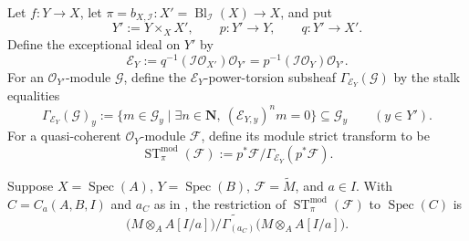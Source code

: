 \begin{definition}
  \label{def:nagata-module-strict-transform}
  \lean{}

  Let $f\colon Y\to X$, let
  $\pi=b_{X,\mathcal I}\colon X'=\operatorname{Bl}_{\mathcal I}(X)\to X$,
  and put
  \[
    Y':=Y\times_XX',\qquad
    p\colon Y'\to Y,\qquad q\colon Y'\to X'.
  \]
  Define the exceptional ideal on $Y'$ by
  \[
    \mathcal E_Y
      :=q^{-1}(\mathcal I\mathcal O_{X'})\mathcal O_{Y'}
      =p^{-1}(\mathcal I\mathcal O_Y)\mathcal O_{Y'}.
  \]
  For an $\mathcal O_{Y'}$-module $\mathcal G$, define the
  $\mathcal E_Y$-power-torsion subsheaf $\Gamma_{\mathcal E_Y}(\mathcal G)$
  by the stalk equalities
  \[
    \Gamma_{\mathcal E_Y}(\mathcal G)_y
      :=\{m\in\mathcal G_y\mid
           \exists n\in\mathbf N,\ (\mathcal E_{Y,y})^n m=0\}
      \subseteq\mathcal G_y
      \qquad(y\in Y').
  \]
  For a quasi-coherent $\mathcal O_Y$-module $\mathcal F$, define its module
  strict transform to be
  \[
    \operatorname{ST}^{\mathrm{mod}}_\pi(\mathcal F)
      :=p^*\mathcal F\big/
         \Gamma_{\mathcal E_Y}(p^*\mathcal F).
  \]
\end{definition}

\begin{lemma}
  \label{lemma:nagata-module-strict-transform-chart}
  \lean{}

  Suppose $X=\operatorname{Spec}(A)$, $Y=\operatorname{Spec}(B)$,
  $\mathcal F=\widetilde M$, and $a\in I$.  With
  $C=C_a(A,B,I)$ and $a_C$ as in
  , the restriction
  of $\operatorname{ST}^{\mathrm{mod}}_\pi(\mathcal F)$ to
  $\operatorname{Spec}(C)$ is
  \[
    \widetilde{\bigl(M\otimes_AA[I/a]\bigr)\big/
      \Gamma_{(a_C)}\bigl(M\otimes_AA[I/a]\bigr)}.
  \]
\end{lemma}

